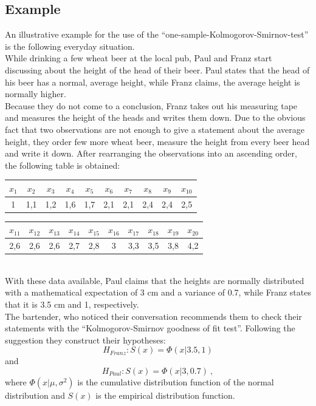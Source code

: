 \documentclass{article}
\begin{document}
\subsection{Example}
An illustrative example for the use of the ``one-sample-Kolmogorov-Smirnov-test'' is the following everyday situation.\\
While drinking a few wheat beer at the local pub, Paul and Franz start discussing about the height of the head of their beer.
Paul states that the head of his beer has a normal, average height, while Franz claims, the average height is normally higher.\\
Because they do not come to a conclusion, Franz takes out his measuring tape and measures the height of the heads and writes them down. Due to the obvious fact that two observations are not enough to give a statement about the average height, they order few more wheat beer, measure the height from every beer head and write it down.
After rearranging the observations into an ascending order, the following table is obtained:
\begin{table}[h]
\center
\begin{tabular}{c|c|c|c|c|c|c|c|c|c}
$x_1$	&$x_2$	&$x_3$	&$x_4$	&$x_5$	&$x_6$	&$x_7$	&$x_8$	&$x_9$	&$x_{10}$\\
\hline
1	&1,1	&1,2	&1,6	&1,7	&2,1	&2,1	&2,4	&2,4	&2,5	\\
\end{tabular}
\begin{tabular}{c|c|c|c|c|c|c|c|c|c}
$x_{11}$	&$x_{12}$	&$x_{13}$	&$x_{14}$	&$x_{15}$	&$x_{16}$	&$x_{17}$	&$x_{18}$	&$x_{19}$	&$x_{20}$\\
\hline
2,6	&2,6	&2,6	&2,7	&2,8	&3	&3,3	&3,5	&3,8	&4,2\\
\end{tabular}
\end{table}
\\
With these data available, Paul claims that the heights are normally distributed with a mathematical expectation of 3 cm and a variance of 0.7, while Franz states that it is 3.5 cm and 1, respectively.\\
The bartender, who noticed their conversation recommends them to check their statements with the ``Kolmogorov-Smirnov goodness of fit test''.
Following the suggestion they construct their hypotheses:
$$H_{Franz} : S(x) = \Phi (x|3.5,1)$$
and
$$H_{Paul} : S(x) = \Phi (x|3,0.7)~,$$
where $\Phi(x|\mu,\sigma^2)$ is the cumulative distribution function of the normal distribution and $S(x)$ is the empirical distribution function.\\
\end{document}
